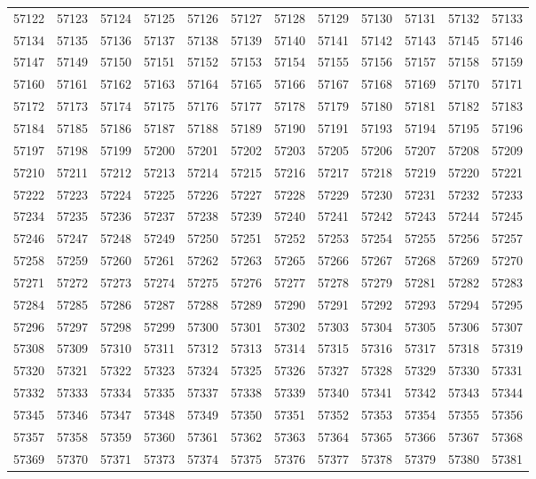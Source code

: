 \begin{center}
\begin{longtable}{llllllllllll}
57122 &57123 &57124 &57125 &57126 &57127 &57128 &57129 &57130 &57131 &57132 &57133 \\
57134 &57135 &57136 &57137 &57138 &57139 &57140 &57141 &57142 &57143 &57145 &57146 \\
57147 &57149 &57150 &57151 &57152 &57153 &57154 &57155 &57156 &57157 &57158 &57159 \\
57160 &57161 &57162 &57163 &57164 &57165 &57166 &57167 &57168 &57169 &57170 &57171 \\
57172 &57173 &57174 &57175 &57176 &57177 &57178 &57179 &57180 &57181 &57182 &57183 \\
57184 &57185 &57186 &57187 &57188 &57189 &57190 &57191 &57193 &57194 &57195 &57196 \\
57197 &57198 &57199 &57200 &57201 &57202 &57203 &57205 &57206 &57207 &57208 &57209 \\
57210 &57211 &57212 &57213 &57214 &57215 &57216 &57217 &57218 &57219 &57220 &57221 \\
57222 &57223 &57224 &57225 &57226 &57227 &57228 &57229 &57230 &57231 &57232 &57233 \\
57234 &57235 &57236 &57237 &57238 &57239 &57240 &57241 &57242 &57243 &57244 &57245 \\
57246 &57247 &57248 &57249 &57250 &57251 &57252 &57253 &57254 &57255 &57256 &57257 \\
57258 &57259 &57260 &57261 &57262 &57263 &57265 &57266 &57267 &57268 &57269 &57270 \\
57271 &57272 &57273 &57274 &57275 &57276 &57277 &57278 &57279 &57281 &57282 &57283 \\
57284 &57285 &57286 &57287 &57288 &57289 &57290 &57291 &57292 &57293 &57294 &57295 \\
57296 &57297 &57298 &57299 &57300 &57301 &57302 &57303 &57304 &57305 &57306 &57307 \\
57308 &57309 &57310 &57311 &57312 &57313 &57314 &57315 &57316 &57317 &57318 &57319 \\
57320 &57321 &57322 &57323 &57324 &57325 &57326 &57327 &57328 &57329 &57330 &57331 \\
57332 &57333 &57334 &57335 &57337 &57338 &57339 &57340 &57341 &57342 &57343 &57344 \\
57345 &57346 &57347 &57348 &57349 &57350 &57351 &57352 &57353 &57354 &57355 &57356 \\
57357 &57358 &57359 &57360 &57361 &57362 &57363 &57364 &57365 &57366 &57367 &57368 \\
57369 &57370 &57371 &57373 &57374 &57375 &57376 &57377 &57378 &57379 &57380 &57381 \\

\end{longtable}
\end{center}
